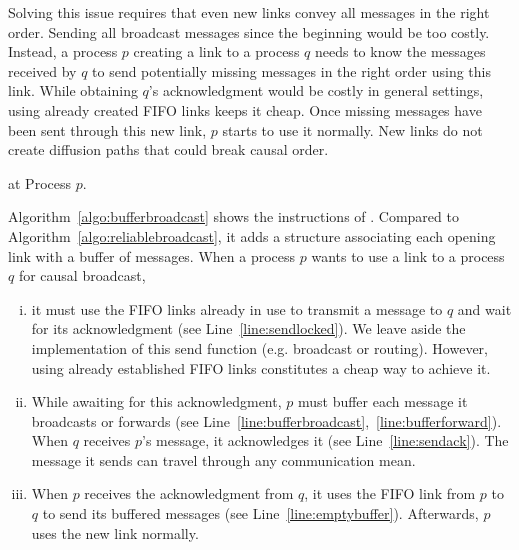 Solving this issue requires that even new links convey all messages in the right
order. Sending all broadcast messages since the beginning would be too
costly. Instead, a process $p$ creating a link to a process $q$ needs to know
the messages received by $q$ to send potentially missing messages in the right
order using this link. While obtaining $q$'s acknowledgment would be costly in
general settings, using already created FIFO links keeps it cheap. Once missing
messages have been sent through this new link, $p$ starts to use it
normally. New links do not create diffusion paths that could break causal order.


\begin{algorithm}[h]
  
  \caption{\label{algo:bufferbroadcast}\CBROADCAST at Process $p$.}
\end{algorithm}

Algorithm~\ref{algo:bufferbroadcast} shows the instructions of \CBROADCAST. 
Compared to Algorithm~\ref{algo:reliablebroadcast}, it adds a structure
associating each opening link with a buffer of messages.  When a process $p$
wants to use a link to a process $q$ for causal broadcast,
\begin{enumerate}[(i)]
\item it must use the FIFO links already in use to transmit a message to $q$
  and wait for its acknowledgment (see Line~\ref{line:sendlocked}). We leave
  aside the implementation of this send function (e.g. broadcast or
  routing). However, using already established FIFO links constitutes a cheap
  way to achieve it.
\item While awaiting for this acknowledgment, $p$ must buffer each message it
  broadcasts or forwards (see
  Line~\ref{line:bufferbroadcast},~\ref{line:bufferforward}). When $q$ receives
  $p$'s message, it acknowledges it (see Line~\ref{line:sendack}). The message
  it sends can travel through any communication mean.
\item When $p$ receives the acknowledgment from $q$, it uses the FIFO link
  from $p$ to $q$ to send its buffered messages (see
  Line~\ref{line:emptybuffer}). Afterwards, $p$ uses the new link normally.
\end{enumerate}

